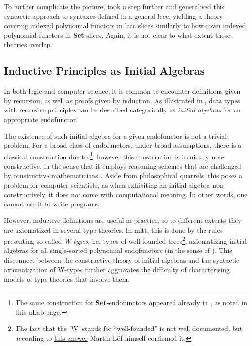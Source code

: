 \documentclass[a4paper]{article}
\newcommand{\catname}[1]{{\normalfont\textbf{#1}}}
\newcommand{\Set}{\catname{Set}}
\begin{document}
To further complicate the picture, \textcite{Gambino2009} took a step further and generalised this syntactic approach to syntaxes defined in a general \gls{lccc}, yielding a theory covering indexed polynomial functors in \gls{lccc} slices similarly to how \cite{Altenkirch2015} cover indexed polynomial functors in \Set{}-slices. Again, it is not clear to what extent these theories overlap.

\subsection{Inductive Principles as Initial Algebras}

In both logic and computer science, it is common to encounter definitions given by recursion, as well as proofs given by induction. As illustrated in \cite[Section 10.5]{Awodey2010}, data types with recursive principles can be described categorically as \textit{initial algebras} for an appropriate endofunctor.

The existence of such initial algebra for a given endofunctor is not a trivial problem. For a broad class of endofunctors, under broad assumptions, there is a classical construction due to \textcite{Adamek1974}\footnote{The same construction for \Set{}-endofunctors appeared already in \textcite{Pohlova1973}, as noted in \href{https://ncatlab.org/nlab/show/Ad\%C3\%A1mek\%27s+fixed+point+theorem}{this nLab page}.}; however this construction is ironically non-constructive, in the sense that it employs reasoning schemes that are challenged by constructive mathematicians \cite[Theorem 1.1, discussion]{Pitts2021}. Aside from philosophical quarrels, this poses a problem for computer scientists, as when exhibiting an initial algebra non-constructively, it does not come with computational meaning. In other words, one cannot use it to write programs.

However, inductive definitions are useful in practice, so to different extents they are axiomatized in several type theories. In \gls{mltt}, this is done by the rules presenting so-called \textit{W-types}, i.e. types of well-founded trees\footnote{The fact that the 'W' stands for ``well-founded'' is not well documented, but according to \href{https://mathoverflow.net/questions/402435/why-are-w-types-called-w}{this answer} Martin-Löf himself confirmed it.}, axiomatizing initial algebras for all single-sorted polynomial endofunctors (in the sense of \cite{Abbott2005}). This disconnect between the constructive theory of initial algebras and the syntactic axiomatization of W-types further aggravates the difficulty of characterising models of type theories that involve them.
\end{document}
